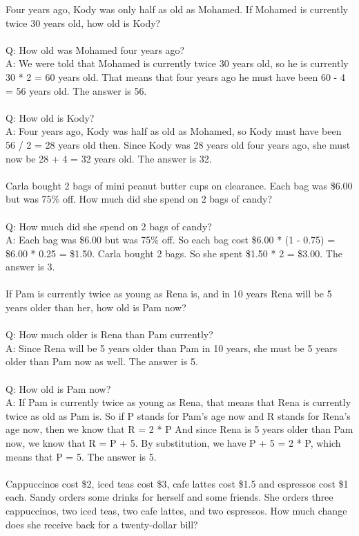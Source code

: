Four years ago, Kody was only half as old as Mohamed. If Mohamed is currently twice 30 years old, how old is Kody? \\
 \\
Q: How old was Mohamed four years ago? \\
A: We were told that Mohamed is currently twice 30 years old, so he is currently 30 * 2 = 60 years old. That means that four years ago he must have been 60 - 4 = 56 years old. The answer is 56. \\
 \\
Q: How old is Kody? \\
A: Four years ago, Kody was half as old as Mohamed, so Kody must have been 56 / 2 = 28 years old then. Since Kody was 28 years old four years ago, she must now be 28 + 4 = 32 years old. The answer is 32. \\
 \\
Carla bought 2 bags of mini peanut butter cups on clearance. Each bag was \$6.00 but was 75\% off. How much did she spend on 2 bags of candy? \\
 \\
Q: How much did she spend on 2 bags of candy? \\
A: Each bag was \$6.00 but was 75\% off. So each bag cost \$6.00 * (1 - 0.75) = \$6.00 * 0.25 = \$1.50. Carla bought 2 bags. So she spent \$1.50 * 2 = \$3.00. The answer is 3. \\
 \\
If Pam is currently twice as young as Rena is, and in 10 years Rena will be 5 years older than her, how old is Pam now? \\
 \\
Q: How much older is Rena than Pam currently? \\
A: Since Rena will be 5 years older than Pam in 10 years, she must be 5 years older than Pam now as well. The answer is 5. \\
 \\
Q: How old is Pam now? \\
A: If Pam is currently twice as young as Rena, that means that Rena is currently twice as old as Pam is. So if P stands for Pam's age now and R stands for Rena's age now, then we know that R = 2 * P And since Rena is 5 years older than Pam now, we know that R = P + 5. By substitution, we have P + 5 = 2 * P, which means that P = 5. The answer is 5. \\
 \\
Cappuccinos cost \$2, iced teas cost \$3, cafe lattes cost \$1.5 and espressos cost \$1 each. Sandy orders some drinks for herself and some friends. She orders three cappuccinos, two iced teas, two cafe lattes, and two espressos. How much change does she receive back for a twenty-dollar bill? \\
